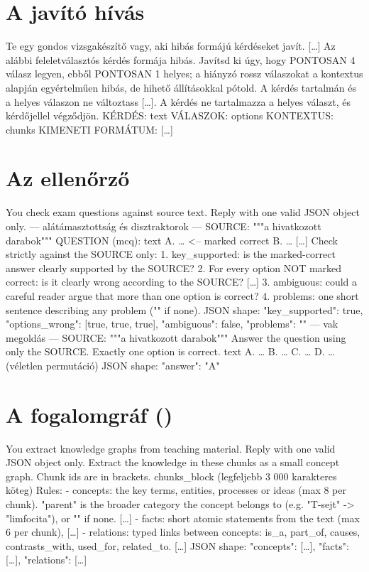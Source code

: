 \section{A javító hívás}
\begin{kodblokk}
[repair] Te egy gondos vizsgakészítő vagy, aki hibás formájú kérdéseket javít. […]
Az alábbi feleletválasztós kérdés formája hibás. Javítsd ki úgy, hogy PONTOSAN 4 válasz legyen,
ebből PONTOSAN 1 helyes; a hiányzó rossz válaszokat a kontextus alapján egyértelműen hibás, de
hihető állításokkal pótold. A kérdés tartalmán és a helyes válaszon ne változtass […]. A kérdés ne
tartalmazza a helyes választ, és kérdőjellel végződjön.
KÉRDÉS: {text}   VÁLASZOK: {options}   KONTEXTUS: {chunks}   KIMENETI FORMÁTUM: […]
\end{kodblokk}

\section{Az ellenőrző}
\begin{kodblokk}
[verifier] You check exam questions against source text. Reply with one valid JSON object only.
--- alátámasztottság és disztraktorok ---
SOURCE: """{a hivatkozott darabok}"""
QUESTION (mcq): {text}
A. …   <-- marked correct
B. …  […]
Check strictly against the SOURCE only:
1. key_supported: is the marked-correct answer clearly supported by the SOURCE?
2. For every option NOT marked correct: is it clearly wrong according to the SOURCE? […]
3. ambiguous: could a careful reader argue that more than one option is correct?
4. problems: one short sentence describing any problem ("" if none).
JSON shape: {"key_supported": true, "options_wrong": [true, true, true], "ambiguous": false,
             "problems": ""}
--- vak megoldás ---
SOURCE: """{a hivatkozott darabok}"""
Answer the question using only the SOURCE. Exactly one option is correct.
{text}
A. …  B. …  C. …  D. …        (véletlen permutáció)
JSON shape: {"answer": "A"}
\end{kodblokk}

\section{A fogalomgráf ()}
\begin{kodblokk}
[graph] You extract knowledge graphs from teaching material. Reply with one valid JSON object only.
Extract the knowledge in these chunks as a small concept graph. Chunk ids are in brackets.
{chunks_block}            (legfeljebb 3 000 karakteres köteg)
Rules:
- concepts: the key terms, entities, processes or ideas (max 8 per chunk). "parent" is the broader
  category the concept belongs to (e.g. "T-sejt" -> "limfocita"), or "" if none. […]
- facts: short atomic statements from the text (max 6 per chunk), […]
- relations: typed links between concepts: is_a, part_of, causes, contrasts_with, used_for,
  related_to. […]
JSON shape: {"concepts": […], "facts": […], "relations": […]}
\end{kodblokk}

